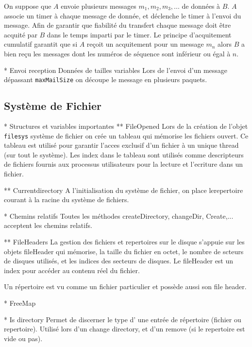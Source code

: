 \documentclass[11pt]{article}
\begin{document}
On suppose que $A$ envoie plusieurs messages $m_1, m_2, m_3, ... $ de données à $B$.
$A$ associe un timer à chaque message de donnée, et déclenche le timer à l'envoi du message.
Afin de garantir que fiabilité du transfert chaque message doit être acquité par $B$ dans le temps imparti par le timer. Le principe d'acquitement cumulatif garantit que si $A$ reçoit un acquitement pour un message $m_n$ alors $B$ a bien reçu les messages dont les numéros de séquence sont inférieur ou égal à $n$.

* Envoi reception Données de tailles variables
Lors de l'envoi d'un message dépassant \texttt{maxMailSize} on découpe le message en plusieurs paquets.

\subsection{Système de Fichier}


* Structures et variables importantes 
** FileOpened 
Lors de la création de l'objet \texttt{filesys} système de fichier on crée un tableau qui mémorise les fichiers ouvert. Ce tableau est utilisé pour garantir l'acces exclusif d'un fichier à un unique thread (sur tout le système). Les index dans le tableau sont utilisés comme descripteurs de fichiers fournis aux processus utilisateurs pour la lecture et l'ecriture dans un fichier.


** Currentdirectory
A l'initialisation du système de fichier, on place lerepertoire courant à la racine du système de fichiers.

* Chemins relatifs
Toutes les méthodes createDirectory, changeDir, Create,... acceptent les chemins relatifs.

** FileHeaders
La gestion des fichiers et repertoires sur le disque s'appuie sur les objets fileHeader qui mémorise,
la taille du fichier en octet, le nombre de scteurs de disques utilisés, et les indices des secteurs de disques.
Le fileHeader est un index pour accéder au contenu réel du fichier.


Un répertoire est vu comme un fichier particulier et possède aussi son file header.
 
* FreeMap

* Is directory
Permet de discerner le type d' une entrée de répertoire (fichier ou repertoire).
Utilisé lors d'un change directory, et d'un remove (si le repertoire est vide ou pas).
 
\end{document}
